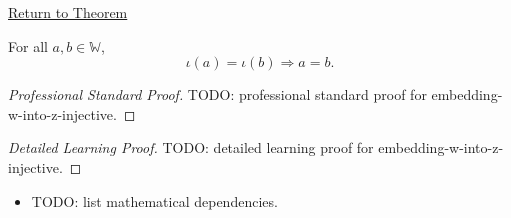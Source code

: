 \newpage
{}
\label{prf:embedding-w-into-z-injective}

\begin{remark*}[Return]
\hyperref[thm:embedding-w-into-z-injective]{Return to Theorem}
\end{remark*}

\begin{theorem*}
For all $a,b\in\mathbb{W}$,
\[
\iota(a)=\iota(b)\Longrightarrow a=b.
\]
\end{theorem*}

\begin{proof}[Professional Standard Proof]
\LRAProofBodyStart
TODO: professional standard proof for embedding-w-into-z-injective.
\end{proof}

\begin{proof}[Detailed Learning Proof]
\LRAProofBodyStart
TODO: detailed learning proof for embedding-w-into-z-injective.
\end{proof}

\begin{remark*}
\end{remark*}

\begin{dependencies}
\begin{itemize}
  \item TODO: list mathematical dependencies.
\end{itemize}
\end{dependencies}

\clearpage
